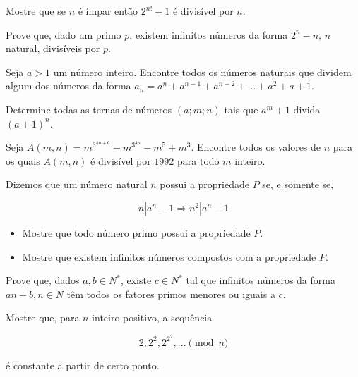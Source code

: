 \begin{questao}
  Mostre que se $n$ é ímpar então $2^{n!}-1$ é divisível por $n$.
\end{questao}

\begin{questao}
  Prove que, dado um primo $p$, existem infinitos números
  da forma $2^n-n$, $n$ natural, divisíveis por $p$.
\end{questao}

\begin{questao}
  Seja $a>1$ um número inteiro. Encontre todos os números
  naturais que dividem algum dos números da forma $a_n = a^n +
  a^{n-1} +  a^{n-2} + \ldots + a^{2} + a + 1$.
\end{questao}

\begin{questao}
  Determine todas as ternas de números $(a;m;n)$ tais que
  $a^m+1$ divida $(a+1)^n$.
\end{questao}

\begin{questao}
  Seja $A(m,n) = m^{3^{4n+6}} -m^{3^{4n}} - m^5 +
  m^3$. Encontre todos os valores de $n$ para os quais $A(m,n)$ é
  divisível por $1992$ para todo $m$ inteiro.
\end{questao}

\begin{questao}
  Dizemos que um número natural $n$ possui a propriedade
  $P$ se, e somente se,

  $$ n|a^n-1 \Rightarrow n^2|a^n-1$$

  \begin{itemize}
    \item Mostre que todo número primo possui a propriedade $P$.

    \item Mostre que existem infinitos números compostos com a
    propriedade $P$.
  \end{itemize}
\end{questao}

\begin{questao}
  Prove que, dados $a,b \in N^{*}$, existe $c \in N^{*}$ tal que
  infinitos números da forma $an+b, n \in N$ têm todos os fatores
  primos menores ou iguais a $c$.
\end{questao}

\begin{questao}
  Mostre que, para $n$ inteiro positivo, a sequência

  $$ 2,2^2,2^{2^2},\ldots \pmod{n} $$

  é constante a partir de certo ponto.
\end{questao}

